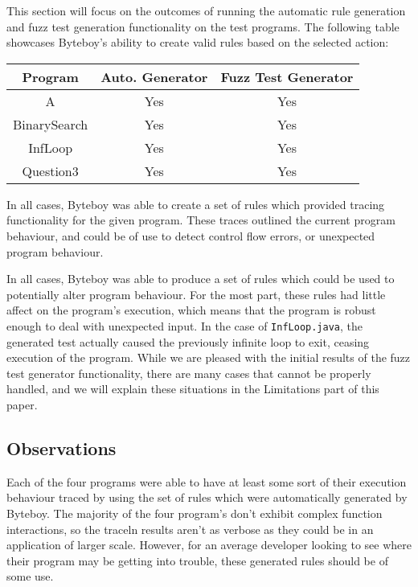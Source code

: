 \documentclass[letterpaper,twocolumn,10pt]{article}
\begin{document}
This section will focus on the outcomes of running the automatic rule generation and fuzz test generation functionality on the test programs. The following table showcases Byteboy's ability to create valid rules based on the selected action:
\begin{center}
 \begin{tabular}{||c | c | c||} 
 \hline
 Program & Auto. Generator & Fuzz Test Generator\\ [0.5ex] 
 \hline\hline
 A & Yes & Yes\\ 
 \hline
 BinarySearch & Yes & Yes\\
 \hline
 InfLoop & Yes & Yes\\
 \hline
 Question3 & Yes & Yes\\ [1ex] 
 \hline
\end{tabular}
\end{center}

In all cases, Byteboy was able to create a set of rules which provided tracing functionality for the given program. These traces outlined the current program behaviour, and could be of use to detect control flow errors, or unexpected program behaviour.

In all cases, Byteboy was able to produce a set of rules which could be used to potentially alter program behaviour. For the most part, these rules had little affect on the program's execution, which means that the program is robust enough to deal with unexpected input. In the case of {\tt InfLoop.java}, the generated test actually caused the previously infinite loop to exit, ceasing execution of the program. While we are pleased with the initial results of the fuzz test generator functionality, there are many cases that cannot be properly handled, and we will explain these situations in the Limitations part of this paper. 

\subsection{Observations}

Each of the four programs were able to have at least some sort of their execution behaviour traced by using the set of rules which were automatically generated by Byteboy. The majority of the four program's don't exhibit complex function interactions, so the traceln results aren't as verbose as they could be in an application of larger scale. However, for an average developer looking to see where their program may be getting into trouble, these generated rules should be of some use.
\end{document}
